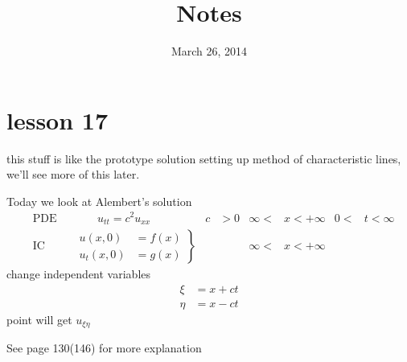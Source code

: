 \documentclass{article}
\begin{document}
\title{Notes}
\date{March 26, 2014}
\maketitle
\section*{lesson 17}
this stuff is like the prototype solution setting up method of characteristic lines, we'll see more of this later.

Today we look at Alembert's solution
\begin{align*}
  &\text{PDE}&&\qquad u_{tt}=c^2u_{xx}&c&>0&\infty<&x<+\infty&0<&t<\infty\\
  &\text{IC}&&\left.
  \begin{aligned}
    u(x,0)&=f(x)\\
    u_t(x,0)&=g(x)
  \end{aligned}
  \right\}&&&\infty<&x<+\infty
\end{align*}
change independent variables
\begin{align*}
  \xi&=x+ct\\
  \eta&=x-ct
\end{align*}
point will get $u_{\xi\eta}$

See page 130(146) for more explanation
\end{document}

